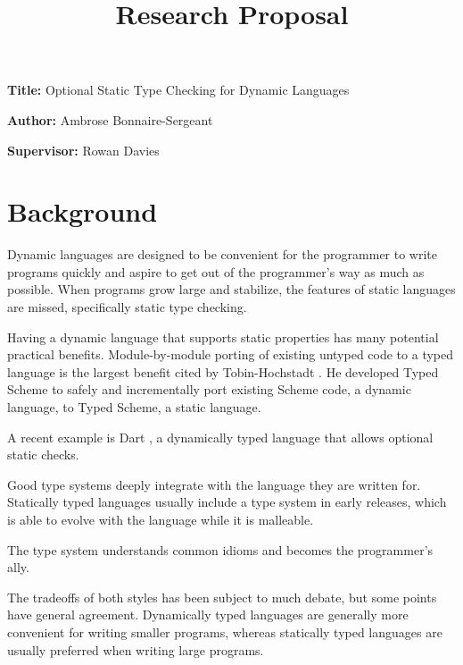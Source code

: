 \documentclass[12pt, a4paper]{article}
\title{Research Proposal}
\author{}
\date{}
\newcommand{\namelistlabel}[1]{\mbox{#1}\hfil}
\newenvironment{namelist}[1]{%
\begin{list}{}
    {
        \let\makelabel\namelistlabel
        \settowidth{\labelwidth}{#1}
        \setlength{\leftmargin}{1.1\labelwidth}
    }
  }{%
\end{list}}
\begin{document}
\maketitle

\begin{namelist}{xxxxxxxxxxxx}
\item[{\bf Title:}]
	Optional Static Type Checking for Dynamic Languages
\item[{\bf Author:}]
	Ambrose Bonnaire-Sergeant
\item[{\bf Supervisor:}]
	Rowan Davies
\end{namelist}

\section*{Background} 


Dynamic languages are designed to be convenient for the programmer to
write programs quickly and aspire to get out of the programmer's
way as much as possible. When programs grow large and stabilize,
the features of static languages are missed, specifically static
type checking. 

Having a dynamic language that supports static properties 
has many potential practical benefits. 
Module-by-module porting of existing untyped code to a typed language 
is the largest benefit cited by Tobin-Hochstadt \cite{TypedScheme:2010}.
He developed Typed Scheme
\cite{TypedScheme:2010} 
to safely and incrementally port existing Scheme code, a dynamic language, to
Typed Scheme, a static language.

A recent example is Dart 
\cite{Dart:2012:Online}, a dynamically typed language that allows optional
static checks.

Good type systems deeply integrate with the language they are written for.
Statically typed languages usually include a type system in early releases,
which is able to evolve with the language while it is malleable.

The type system understands common idioms
and becomes the programmer's ally.

The tradeoffs of both styles has been subject to much debate, but some
points have general agreement. Dynamically typed languages
are generally more convenient for writing smaller 
programs, whereas statically typed languages are usually preferred 
when writing large programs.
\end{document}
